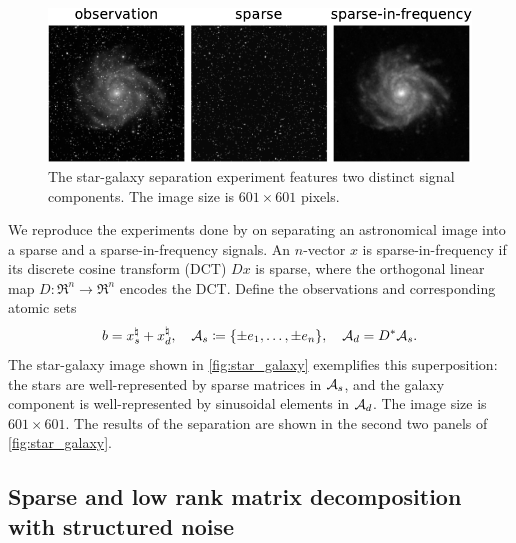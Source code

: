 \begin{figure}[t]
    \centering
   \includegraphics[width=.9\textwidth]{./figures/StarGalaxy.pdf}
    \caption{The star-galaxy separation experiment features two distinct signal components. The image size is $601\times601$ pixels.}
    \label{fig:star_galaxy}
\end{figure}

We reproduce the experiments done by \citet{mccoy2014convexity} on separating an astronomical image into a sparse and a sparse-in-frequency signals. An $n$-vector $x$ is sparse-in-frequency if its discrete cosine transform (DCT) $Dx$ is sparse, where the orthogonal linear map $D:\Re^n\to\Re^n$ encodes the DCT. Define the observations and corresponding atomic sets
\[
  b = x^{\natural}_s + x^{\natural}_d,
  \quad
  \mathcal{A}_s \coloneqq  \{\pm e_1, \dots, \pm e_n\}, \quad \mathcal{A}_d = D^*\mathcal{A}_s.
\]
The star-galaxy image shown in \autoref{fig:star_galaxy} exemplifies this superposition: the stars are well-represented by sparse matrices in $\mathcal{A}_s$, and the galaxy component is well-represented by sinusoidal elements in $\mathcal{A}_d$. The image size is $601\times601$. The results of the separation are shown in the second two panels of \autoref{fig:star_galaxy}.

\subsection{Sparse and low rank matrix decomposition with structured noise}\label{sec:3-5-3}

